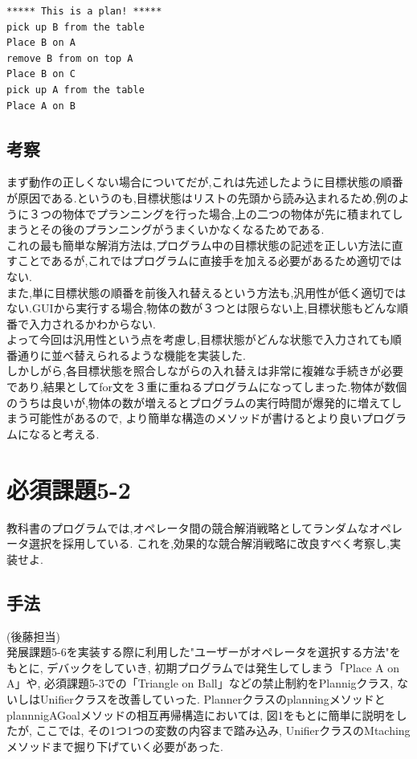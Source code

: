 \documentclass[uplatex,12pt]{jsarticle}
\begin{document}
\begin{lstlisting}[caption=実行結果, label=mid]
***** This is a plan! *****
pick up B from the table
Place B on A
remove B from on top A
Place B on C
pick up A from the table
Place A on B
\end{lstlisting}

\subsection{考察}
まず動作の正しくない場合についてだが,これは先述したように目標状態の順番が原因である.というのも,目標状態はリストの先頭から読み込まれるため,例のように３つの物体でプランニングを行った場合,上の二つの物体が先に積まれてしまうとその後のプランニングがうまくいかなくなるためである.\\
これの最も簡単な解消方法は,プログラム中の目標状態の記述を正しい方法に直すことであるが,これではプログラムに直接手を加える必要があるため適切ではない.\\
また,単に目標状態の順番を前後入れ替えるという方法も,汎用性が低く適切ではない.GUIから実行する場合,物体の数が３つとは限らない上,目標状態もどんな順番で入力されるかわからない.\\
よって今回は汎用性という点を考慮し,目標状態がどんな状態で入力されても順番通りに並べ替えられるような機能を実装した.\\
しかしがら,各目標状態を照合しながらの入れ替えは非常に複雑な手続きが必要であり,結果としてfor文を３重に重ねるプログラムになってしまった.物体が数個のうちは良いが,物体の数が増えるとプログラムの実行時間が爆発的に増えてしまう可能性があるので, より簡単な構造のメソッドが書けるとより良いプログラムになると考える.


\section{必須課題5-2}
\begin{screen}
教科書のプログラムでは,オペレータ間の競合解消戦略としてランダムなオペレータ選択を採用している.
これを,効果的な競合解消戦略に改良すべく考察し,実装せよ.
\end{screen}
\subsection{手法}
\noindent (後藤担当) \\
発展課題5-6を実装する際に利用した"ユーザーがオペレータを選択する方法"をもとに, デバックをしていき, 初期プログラムでは発生してしまう「Place A on A」や,  必須課題5-3での「Triangle on Ball」などの禁止制約をPlannigクラス, ないしはUnifierクラスを改善していった. PlannerクラスのplanningメソッドとplannnigAGoalメソッドの相互再帰構造においては, 図1をもとに簡単に説明をしたが, ここでは, その1つ1つの変数の内容まで踏み込み, UnifierクラスのMtachingメソッドまで掘り下げていく必要があった. \\
\end{document}

